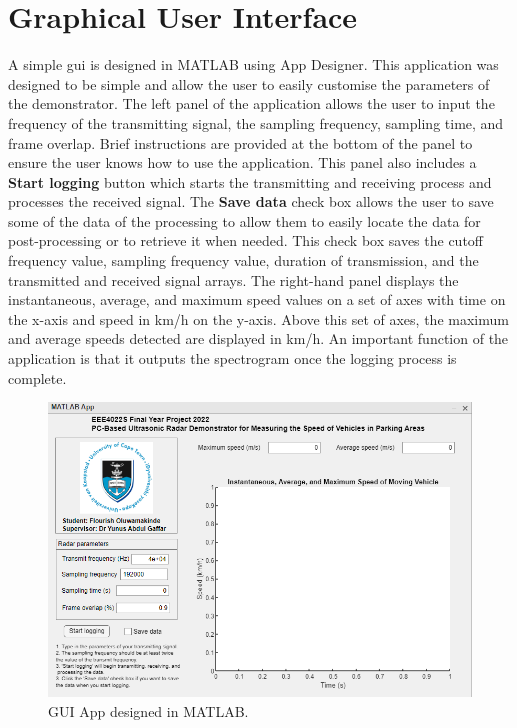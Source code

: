 \documentclass[class=report,11pt,crop=false]{standalone}
\begin{document}
\section{Graphical User Interface}\label{sect:gui}
A simple \gls{gui} is designed in \textsc{MATLAB} using App Designer. This application was designed to be simple and allow the user to easily customise the parameters of the demonstrator. The left panel of the application allows the user to input the frequency of the transmitting signal, the sampling frequency, sampling time, and frame overlap. Brief instructions are provided at the bottom of the panel to ensure the user knows how to use the application. This panel also includes a \textbf{Start logging} button which starts the transmitting and receiving process and processes the received signal. The \textbf{Save data} check box allows the user to save some of the data of the processing to allow them to easily locate the data for post-processing or to retrieve it when needed. This check box saves the cutoff frequency value, sampling frequency value, duration of transmission, and the transmitted and received signal arrays. The right-hand panel displays the instantaneous, average, and maximum speed values on a set of axes with time on the x-axis and speed in km/h on the y-axis. Above this set of axes, the maximum and average speeds detected are displayed in km/h. An important function of the application is that it outputs the spectrogram once the logging process is complete.

\begin{figure}[!htbp]
    \centering
    \includegraphics[width=1\columnwidth]{../Images/gui.png}
    \caption{GUI App designed in \textsc{MATLAB}.}
    \label{fig:gui}
\end{figure}

\ifstandalone

\printnoidxglossary[type=\acronymtype,nonumberlist]
\fi
\end{document}
